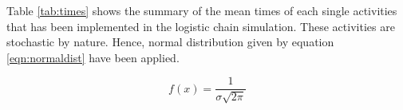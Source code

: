 Table \ref{tab:times} shows the summary of the mean times of each single activities that has been implemented in the logistic chain simulation. These activities are stochastic by nature. Hence, normal distribution given by equation \ref{eqn:normaldist} have been applied.

\begin{equation}
\label{eqn:normaldist}
f\left( x \right) = \frac{1}{\sigma \sqrt{2 \pi} }
\end{equation}
